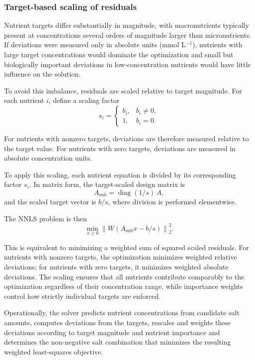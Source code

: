 \documentclass[
  letterpaper,
  DIV=11,
  numbers=noendperiod]{scrreprt}
\begin{document}
\subsubsection{Target-based scaling of
residuals}\label{target-based-scaling-of-residuals}

Nutrient targets differ substantially in magnitude, with macronutrients
typically present at concentrations several orders of magnitude larger
than micronutrients. If deviations were measured only in absolute units
(mmol L\(^{-1}\)), nutrients with large target concentrations would
dominate the optimization and small but biologically important
deviations in low-concentration nutrients would have little influence on
the solution.

To avoid this imbalance, residuals are scaled relative to target
magnitude. For each nutrient \(i\), define a scaling factor \[
s_i =
\begin{cases}
b_i, & b_i \ne 0,\\
1, & b_i = 0.
\end{cases}
\]

For nutrients with nonzero targets, deviations are therefore measured
relative to the target value. For nutrients with zero targets,
deviations are measured in absolute concentration units.

To apply this scaling, each nutrient equation is divided by its
corresponding factor \(s_i\). In matrix form, the target-scaled design
matrix is \[
A_{\mathrm{sub}} = \operatorname{diag}(1/s)\, A,
\] and the scaled target vector is \(b/s\), where division is performed
elementwise.

The NNLS problem is then \[
\min_{x \ge 0}
\left\|
W \left( A_{\mathrm{sub}} x - b/s \right)
\right\|_2^2 .
\]

This is equivalent to minimizing a weighted sum of squared scaled
residuals. For nutrients with nonzero targets, the optimization
minimizes weighted relative deviations; for nutrients with zero targets,
it minimizes weighted absolute deviations. The scaling ensures that all
nutrients contribute comparably to the optimization regardless of their
concentration range, while importance weights control how strictly
individual targets are enforced.

Operationally, the solver predicts nutrient concentrations from
candidate salt amounts, computes deviations from the targets, rescales
and weights these deviations according to target magnitude and nutrient
importance and determines the non-negative salt combination that
minimizes the resulting weighted least-squares objective.
\end{document}
